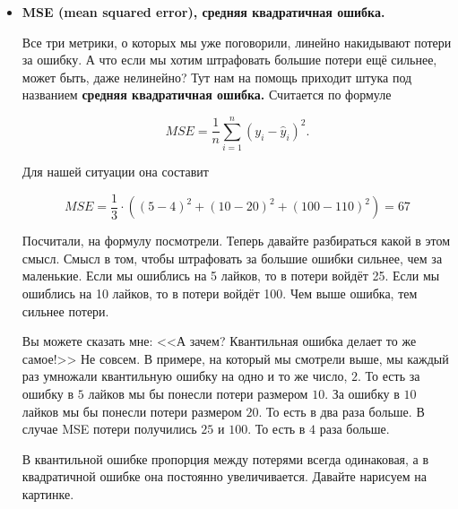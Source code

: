 \documentclass[12pt, a4paper, oneside]{article}
\theoremstyle{plain} %
\theoremstyle{definition}
\newcommand{\indef}[1]{\textbf{ \color{green} #1}}
\begin{document}
\begin{solution}
\begin{itemize}
\item \indef{MSE (mean squared error), средняя квадратичная ошибка.} 

Все три метрики, о которых мы уже поговорили, линейно накидывают потери за ошибку. А что если мы хотим штрафовать большие потери ещё сильнее, может быть, даже нелинейно? Тут нам на помощь приходит штука под названием \indef{средняя квадратичная ошибка.} Считается по формуле 

$$ MSE = \frac{1}{n}\sum_{i=1}^{n} (y_i - \hat{y}_i)^2.$$

Для нашей ситуации она составит 

$$
MSE = \frac{1}{3} \cdot(  (5-4)^2 + (10 - 20)^2 + (100 - 110)^2) = 67
$$ 

Посчитали, на формулу посмотрели. Теперь давайте разбираться какой в этом смысл. Смысл в том, чтобы штрафовать за большие ошибки сильнее, чем за маленькие. Если мы ошиблись на 5 лайков, то в потери войдёт 25. Если мы ошиблись на 10 лайков, то в потери войдёт 100. Чем выше ошибка, тем сильнее потери. 

Вы можете сказать мне:  <<А зачем? Квантильная ошибка делает то же самое!>> Не совсем. В примере, на который мы смотрели выше, мы каждый раз умножали квантильную ошибку на одно и то же число, $2$. То есть за ошибку в $5$ лайков мы бы понесли потери размером $10$.  За ошибку в $10$ лайков мы бы понесли потери размером $20$. То есть в два раза больше. В случае MSE потери получились $25$ и $100$. То есть в $4$ раза больше. 

В квантильной ошибке пропорция между потерями всегда одинаковая, а в квадратичной ошибке она постоянно увеличивается.  Давайте нарисуем на картинке. 

\begin{center}
\end{center}
\end{itemize}
\end{solution}
\end{document}
